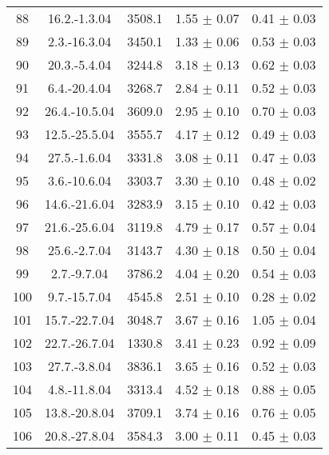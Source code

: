 \documentclass[a4paper,12pt]{article}
\begin{document}
\begin{center}
\begin{longtable}{|c|c|c|c|c|}
    88  &       16.2.-1.3.04    &       3508.1  &       1.55 $\pm$ 0.07 &       0.41 $\pm$ 0.03 \\
    89  &       2.3.-16.3.04    &       3450.1  &       1.33 $\pm$ 0.06 &       0.53 $\pm$ 0.03 \\
    90  &       20.3.-5.4.04    &       3244.8  &       3.18 $\pm$ 0.13 &       0.62 $\pm$ 0.03 \\
    91  &       6.4.-20.4.04    &       3268.7  &       2.84 $\pm$ 0.11 &       0.52 $\pm$ 0.03 \\
    92  &       26.4.-10.5.04   &       3609.0  &       2.95 $\pm$ 0.10 &       0.70 $\pm$ 0.03 \\
    93  &       12.5.-25.5.04   &       3555.7  &       4.17 $\pm$ 0.12 &       0.49 $\pm$ 0.03 \\
    94  &       27.5.-1.6.04    &       3331.8  &       3.08 $\pm$ 0.11 &       0.47 $\pm$ 0.03 \\
    95  &       3.6.-10.6.04    &       3303.7  &       3.30 $\pm$ 0.10 &       0.48 $\pm$ 0.02 \\
    96  &       14.6.-21.6.04   &       3283.9  &       3.15 $\pm$ 0.10 &       0.42 $\pm$ 0.03 \\
    97  &       21.6.-25.6.04   &       3119.8  &       4.79 $\pm$ 0.17 &       0.57 $\pm$ 0.04 \\
    98  &       25.6.-2.7.04    &       3143.7  &       4.30 $\pm$ 0.18 &       0.50 $\pm$ 0.04 \\
    99  &       2.7.-9.7.04     &       3786.2  &       4.04 $\pm$ 0.20 &       0.54 $\pm$ 0.03 \\
    100 &       9.7.-15.7.04    &       4545.8  &       2.51 $\pm$ 0.10 &       0.28 $\pm$ 0.02 \\
    101 &       15.7.-22.7.04   &       3048.7  &       3.67 $\pm$ 0.16 &       1.05 $\pm$ 0.04 \\
    102 &       22.7.-26.7.04   &       1330.8  &       3.41 $\pm$ 0.23 &       0.92 $\pm$ 0.09 \\
    103 &       27.7.-3.8.04    &       3836.1  &       3.65 $\pm$ 0.16 &       0.52 $\pm$ 0.03 \\
    104 &       4.8.-11.8.04    &       3313.4  &       4.52 $\pm$ 0.18 &       0.88 $\pm$ 0.05 \\
    105 &       13.8.-20.8.04   &       3709.1  &       3.74 $\pm$ 0.16 &       0.76 $\pm$ 0.05 \\
    106 &       20.8.-27.8.04   &       3584.3  &       3.00 $\pm$ 0.11 &       0.45 $\pm$ 0.03 \\

\end{longtable}
\end{center}
\end{document}
